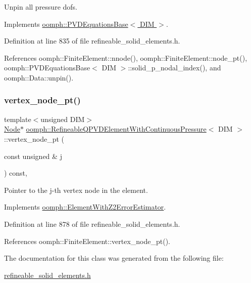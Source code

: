Unpin all pressure dofs. 



Implements \hyperlink{classoomph_1_1PVDEquationsBase_abd9064a8651728806dda27636b1e5b50}{oomph\+::\+P\+V\+D\+Equations\+Base$<$ D\+I\+M $>$}.



Definition at line 835 of file refineable\+\_\+solid\+\_\+elements.\+h.



References oomph\+::\+Finite\+Element\+::nnode(), oomph\+::\+Finite\+Element\+::node\+\_\+pt(), oomph\+::\+P\+V\+D\+Equations\+Base$<$ D\+I\+M $>$\+::solid\+\_\+p\+\_\+nodal\+\_\+index(), and oomph\+::\+Data\+::unpin().

\mbox{\label{classoomph_1_1RefineableQPVDElementWithContinuousPressure_a9afc4605536e3f3a637ae1694c0d9065}} 
\subsubsection{\texorpdfstring{vertex\+\_\+node\+\_\+pt()}{vertex\_node\_pt()}}
{\footnotesize\ttfamily template$<$unsigned D\+IM$>$ \\
\hyperlink{classoomph_1_1Node}{Node}$\ast$ \hyperlink{classoomph_1_1RefineableQPVDElementWithContinuousPressure}{oomph\+::\+Refineable\+Q\+P\+V\+D\+Element\+With\+Continuous\+Pressure}$<$ D\+IM $>$\+::vertex\+\_\+node\+\_\+pt (\begin{DoxyParamCaption}\item[{const unsigned \&}]{j }\end{DoxyParamCaption}) const\hspace{0.3cm}{\ttfamily [inline]}, {\ttfamily [virtual]}}



Pointer to the j-\/th vertex node in the element. 



Implements \hyperlink{classoomph_1_1ElementWithZ2ErrorEstimator_a0eedccc33519f852c5dc2055ddf2774b}{oomph\+::\+Element\+With\+Z2\+Error\+Estimator}.



Definition at line 878 of file refineable\+\_\+solid\+\_\+elements.\+h.



References oomph\+::\+Finite\+Element\+::vertex\+\_\+node\+\_\+pt().



The documentation for this class was generated from the following file\+:\begin{DoxyCompactItemize}
\item 
\hyperlink{refineable__solid__elements_8h}{refineable\+\_\+solid\+\_\+elements.\+h}\end{DoxyCompactItemize}
